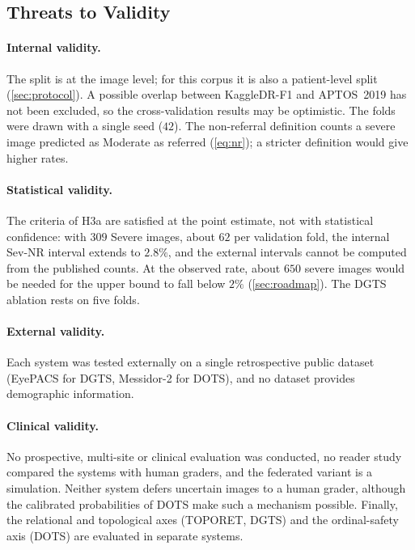 \subsection{Threats to Validity}
\label{sec:notestablished}

\paragraph{Internal validity.}
The split is at the image level; for this corpus it is also a patient-level split
(\cref{sec:protocol}). A possible overlap between KaggleDR-F1 and APTOS~2019 has not been
excluded, so the cross-validation results may be optimistic. The folds were drawn with a
single seed ($42$). The non-referral definition counts a severe image predicted as
Moderate as referred (\cref{eq:nr}); a stricter definition would give higher rates.

\paragraph{Statistical validity.}
The criteria of H3a are satisfied at the point estimate, not with statistical confidence:
with $309$ Severe images, about $62$ per validation fold, the internal Sev-NR interval
extends to $2.8\%$, and the external intervals cannot be computed from the published
counts. At the observed rate, about $650$ severe images would be needed for the upper
bound to fall below $2\%$ (\cref{sec:roadmap}). The DGTS ablation rests on five folds.

\paragraph{External validity.}
Each system was tested externally on a single retrospective public dataset (EyePACS for
DGTS, Messidor-2 for DOTS), and no dataset provides demographic information.

\paragraph{Clinical validity.}
No prospective, multi-site or clinical evaluation was conducted, no reader study compared
the systems with human graders, and the federated variant is a simulation. Neither system
defers uncertain images to a human grader, although the calibrated probabilities of DOTS
make such a mechanism possible. Finally, the relational and topological axes (TOPORET,
DGTS) and the ordinal-safety axis (DOTS) are evaluated in separate systems.

